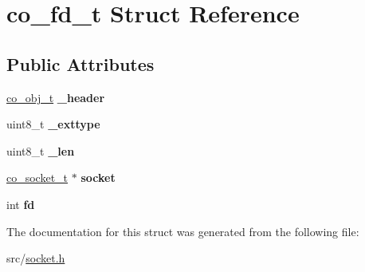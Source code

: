 \hypertarget{structco__fd__t}{\section{co\-\_\-fd\-\_\-t Struct Reference}
\label{structco__fd__t}
}
\subsection*{Public Attributes}
\begin{DoxyCompactItemize}
\item 
\hypertarget{structco__fd__t_a4f9740dc3303163c1f3c14c175d914b8}{\hyperlink{structco__obj__t}{co\-\_\-obj\-\_\-t} {\bfseries \-\_\-header}}\label{structco__fd__t_a4f9740dc3303163c1f3c14c175d914b8}

\item 
\hypertarget{structco__fd__t_a55526f24d89d89d4c3bc8cbccf48c253}{uint8\-\_\-t {\bfseries \-\_\-exttype}}\label{structco__fd__t_a55526f24d89d89d4c3bc8cbccf48c253}

\item 
\hypertarget{structco__fd__t_ad6fcd9e197237d63679db95b8c964190}{uint8\-\_\-t {\bfseries \-\_\-len}}\label{structco__fd__t_ad6fcd9e197237d63679db95b8c964190}

\item 
\hypertarget{structco__fd__t_a7249838c910948ac624d8e1d6d9b6dda}{\hyperlink{structco__socket__t}{co\-\_\-socket\-\_\-t} $\ast$ {\bfseries socket}}\label{structco__fd__t_a7249838c910948ac624d8e1d6d9b6dda}

\item 
\hypertarget{structco__fd__t_a64c95df9ae2fa0da751ec8fe03854e0d}{int {\bfseries fd}}\label{structco__fd__t_a64c95df9ae2fa0da751ec8fe03854e0d}

\end{DoxyCompactItemize}


The documentation for this struct was generated from the following file\-:\begin{DoxyCompactItemize}
\item 
src/\hyperlink{socket_8h}{socket.\-h}\end{DoxyCompactItemize}
